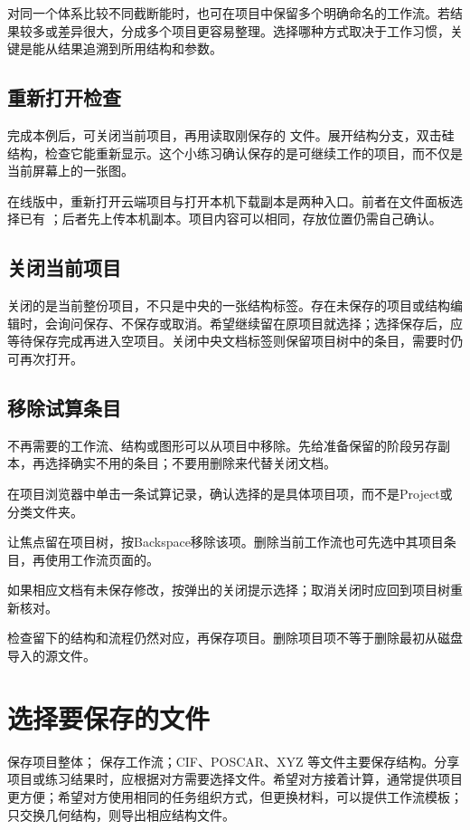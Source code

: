 对同一个体系比较不同截断能时，也可在项目中保留多个明确命名的工作流。若结果较多或差异很大，分成多个项目更容易整理。选择哪种方式取决于工作习惯，关键是能从结果追溯到所用结构和参数。

\subsection{重新打开检查}
完成本例后，可关闭当前项目，再用读取刚保存的  文件。展开结构分支，双击硅结构，检查它能重新显示。这个小练习确认保存的是可继续工作的项目，而不仅是当前屏幕上的一张图。

在线版中，重新打开云端项目与打开本机下载副本是两种入口。前者在文件面板选择已有 ；后者先上传本机副本。项目内容可以相同，存放位置仍需自己确认。

\subsection{关闭当前项目}

关闭的是当前整份项目，不只是中央的一张结构标签。存在未保存的项目或结构编辑时，会询问保存、不保存或取消。希望继续留在原项目就选择；选择保存后，应等待保存完成再进入空项目。关闭中央文档标签则保留项目树中的条目，需要时仍可再次打开。

\subsection{移除试算条目}

不再需要的工作流、结构或图形可以从项目中移除。先给准备保留的阶段另存副本，再选择确实不用的条目；不要用删除来代替关闭文档。

\begin{steps}
\item 在项目浏览器中单击一条试算记录，确认选择的是具体项目项，而不是Project或分类文件夹。
\item 让焦点留在项目树，按Backspace移除该项。删除当前工作流也可先选中其项目条目，再使用工作流页面的。
\item 如果相应文档有未保存修改，按弹出的关闭提示选择；取消关闭时应回到项目树重新核对。
\item 检查留下的结构和流程仍然对应，再保存项目。删除项目项不等于删除最初从磁盘导入的源文件。
\end{steps}


\section{选择要保存的文件}
 保存项目整体； 保存工作流；CIF、POSCAR、XYZ 等文件主要保存结构。分享项目或练习结果时，应根据对方需要选择文件。希望对方接着计算，通常提供项目更方便；希望对方使用相同的任务组织方式，但更换材料，可以提供工作流模板；只交换几何结构，则导出相应结构文件。

